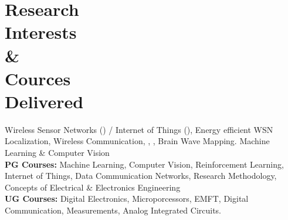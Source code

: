 \vspace{-2.5em}
{\section{Research\\Interests\\\&\\Cources\\Delivered}
Wireless Sensor Networks () / Internet of Things (), Energy efficient WSN Localization, Wireless Communication, , , Brain Wave Mapping. Machine Learning  \& Computer Vision\\ 
\textbf{PG Courses:} Machine Learning, Computer Vision, Reinforcement Learning, Internet of Things, Data Communication Networks, Research Methodology, Concepts of Electrical \& Electronics Engineering\\
\textbf{UG Courses:} Digital Electronics, Microporcessors, EMFT, Digital Communication, Measurements, Analog Integrated Circuits.
\sectionline
}
